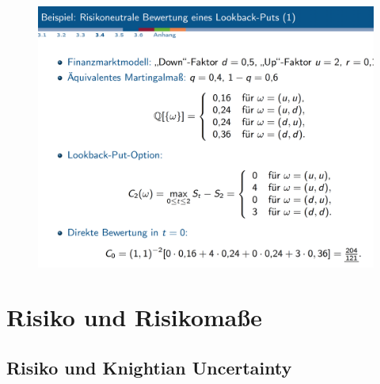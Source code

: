\documentclass[12pt]{report}
\theoremstyle{dotless}
\theoremstyle{definition}
\begin{document}
\begin{figure}[H]
\centering
\includegraphics[width=\textwidth]{Bilder/LookbackPut.png}
\end{figure}
















\chapter{Risiko und Risikomaße}

\section{Risiko und Knightian Uncertainty}
\end{document}
